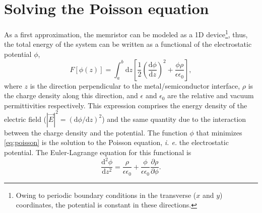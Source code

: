 \section{Solving the Poisson equation}
\label{sec:poisson}

As a first approximation, the memristor can be modeled as a 1D device\footnote{Owing to periodic boundary conditions in the transverse ($x$ and $y$) coordinates, the potential is constant in these directions.}, thus, the total energy of the system can be written as a functional of the electrostatic potential $\phi$,
\begin{equation}
	F[\phi(z)] = \int_a^b \mathrm{d}z \left[ \frac{1}{2}\left( \frac{\mathrm{d}\phi}{\mathrm{d}z}\right)^2+\frac{\phi \rho}{\epsilon \epsilon_0}\right],
	\label{eq:poisson}
\end{equation}
where $z$ is the direction perpendicular to the metal/semiconductor interface, $\rho$ is the charge density along this direction, and $\epsilon$ and $\epsilon_0$ are the relative and vacuum permittivities respectively. This expression comprises the energy density of the electric field ($|\vec{E}|^2=(\mathrm{d}\phi/\mathrm{d}z)^2$) and the same quantity due to the interaction between the charge density and the potential. The function $\phi$ that minimizes \ref{eq:poisson} is the solution to the Poisson equation, \textit{i. e.} the electrostatic potential. The Euler-Lagrange equation for this functional is
\begin{equation}
	\frac{\mathrm{d}^2 \phi}{\mathrm{d}z^2}=\frac{\rho}{\epsilon \epsilon_0} + \frac{\phi}{\epsilon \epsilon_0}\frac{\partial \rho}{\partial \phi}.
	\label{eq:euller-lagrange}
\end{equation}

